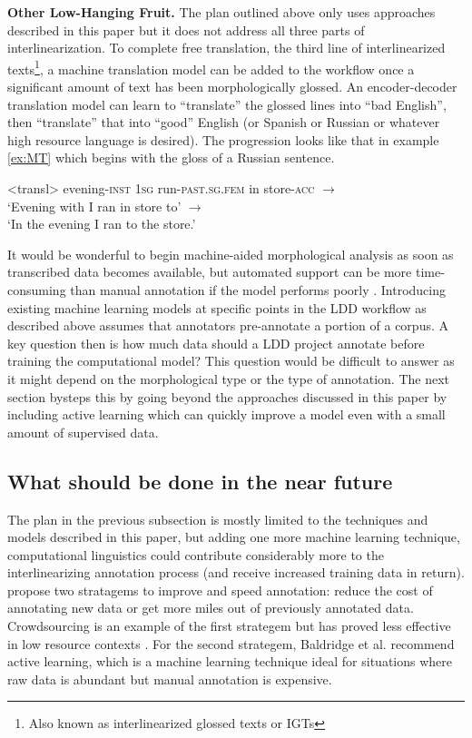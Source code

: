 \documentclass[12pt]{article}
\begin{document}
\textbf{Other Low-Hanging Fruit.} The plan outlined above only uses approaches described in this paper but it does not address all three parts of interlinearization.  To complete free translation, the third line of interlinearized texts\footnote{Also known as interlinearized glossed texts or IGTs}, a machine translation model can be added to the workflow once a significant amount of text has been morphologically glossed. An encoder-decoder translation model can learn to ``translate'' the glossed lines into ``bad English'', then ``translate'' that into ``good'' English (or Spanish or Russian or whatever high resource language is desired). The progression looks like that in example \ref{ex:MT} which begins with the gloss of a Russian sentence.

\begin{singlespace}
\pex<transl> 
\label{ex:MT}
evening\textsc{-inst} \textsc{1sg} run\textsc{-past.sg.fem} in store\textsc{-acc} $\longrightarrow$ \\
`Evening with I ran in store to' $\longrightarrow$ \\
`In the evening I ran to the store.'
\xe
\end{singlespace}

It would be wonderful to begin machine-aided morphological analysis as soon as transcribed data becomes available, but automated support can be more time-consuming than manual annotation if the model performs poorly \cite{kothur_document-level_2018,palmer_semi-automated_2009}. Introducing existing machine learning models at specific points in the LDD workflow as described above assumes that annotators pre-annotate a portion of a corpus. A key question then is how much data should a LDD project annotate before training the computational model? This question would be difficult to answer as it might depend on the morphological type or the type of annotation. The next section bysteps this by going beyond the approaches discussed in this paper by including active learning which can quickly improve a model even with a small amount of supervised data. 

\subsection{What should be done in the near future}

The plan in the previous subsection is mostly limited to the techniques and models described in this paper, but adding one more machine learning technique, computational linguistics could contribute considerably more to the interlinearizing annotation process (and receive increased training data in return).  propose two stratagems to improve and speed annotation: reduce the cost of annotating new data or get more miles out of previously annotated data. Crowdsourcing is an example of the first strategem but has proved less effective in low resource contexts \cite{bird_aikuma:_2014,bettinson_developing_2017}. For the second strategem, Baldridge et al. recommend active learning, which is a machine learning technique ideal for situations where raw data is abundant but manual annotation is expensive. 
\end{document}
